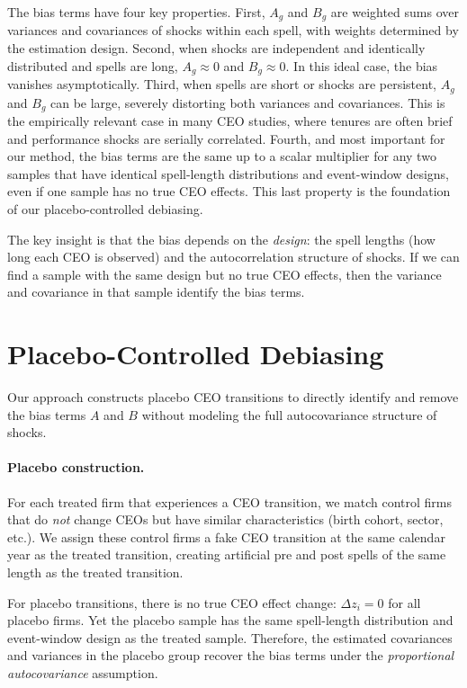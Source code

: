 \documentclass[11pt,a4paper]{article}
\begin{document}
The bias terms have four key properties. First, $A_g$ and $B_g$ are weighted sums over variances and covariances of shocks within each spell, with weights determined by the estimation design. Second, when shocks are independent and identically distributed and spells are long, $A_g\approx 0$ and $B_g\approx 0$. In this ideal case, the bias vanishes asymptotically. Third, when spells are short or shocks are persistent, $A_g$ and $B_g$ can be large, severely distorting both variances and covariances. This is the empirically relevant case in many CEO studies, where tenures are often brief and performance shocks are serially correlated. Fourth, and most important for our method, the bias terms are the same up to a scalar multiplier for any two samples that have identical spell-length distributions and event-window designs, even if one sample has no true CEO effects. This last property is the foundation of our placebo-controlled debiasing.

The key insight is that the bias depends on the \emph{design}: the spell lengths (how long each CEO is observed) and the autocorrelation structure of shocks. If we can find a sample with the same design but no true CEO effects, then the variance and covariance in that sample identify the bias terms. 

\section{Placebo-Controlled Debiasing} 

Our approach constructs placebo CEO transitions to directly identify and remove the bias terms $A$ and $B$ without modeling the full autocovariance structure of shocks.

\paragraph{Placebo construction.} For each treated firm that experiences a CEO transition, we match control firms that do \emph{not} change CEOs but have similar characteristics (birth cohort, sector, etc.). We assign these control firms a fake CEO transition at the same calendar year as the treated transition, creating artificial pre and post spells of the same length as the treated transition.

For placebo transitions, there is no true CEO effect change: $\Delta z_i = 0$ for all placebo firms. Yet the placebo sample has the same spell-length distribution and event-window design as the treated sample. Therefore, the estimated covariances and variances in the placebo group recover the bias terms under the \emph{proportional autocovariance} assumption.
\end{document}

